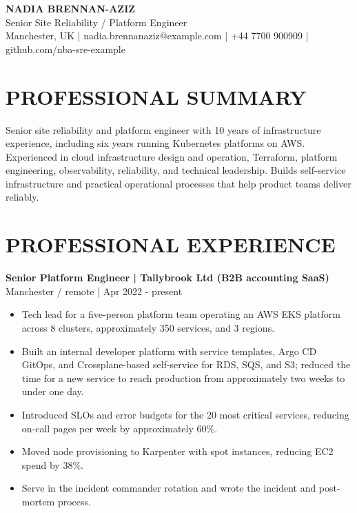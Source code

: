 \documentclass[11pt,a4paper]{article}
\begin{document}
\begin{center}
{\Huge\bfseries\color{primarycolor} NADIA BRENNAN-AZIZ}\\[0.35em]
{\large\color{accentcolor} Senior Site Reliability / Platform Engineer}\\[0.25em]
Manchester, UK | nadia.brennanaziz@example.com | +44 7700 900909 | github.com/nba-sre-example
\end{center}

\section*{PROFESSIONAL SUMMARY}
Senior site reliability and platform engineer with 10 years of infrastructure experience, including six years running Kubernetes platforms on AWS. Experienced in cloud infrastructure design and operation, Terraform, platform engineering, observability, reliability, and technical leadership. Builds self-service infrastructure and practical operational processes that help product teams deliver reliably.

\section*{PROFESSIONAL EXPERIENCE}

\textbf{Senior Platform Engineer | Tallybrook Ltd (B2B accounting SaaS)}\\
Manchester / remote | Apr 2022 - present
\begin{itemize}
\item Tech lead for a five-person platform team operating an AWS EKS platform across 8 clusters, approximately 350 services, and 3 regions.
\item Built an internal developer platform with service templates, Argo CD GitOps, and Crossplane-based self-service for RDS, SQS, and S3; reduced the time for a new service to reach production from approximately two weeks to under one day.
\item Introduced SLOs and error budgets for the 20 most critical services, reducing on-call pages per week by approximately 60\%.
\item Moved node provisioning to Karpenter with spot instances, reducing EC2 spend by 38\%.
\item Serve in the incident commander rotation and wrote the incident and post-mortem process.
\end{itemize}
\end{document}
